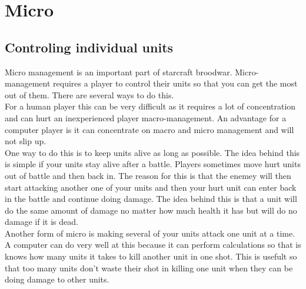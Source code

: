 \section{Micro}
\subsection{Controling individual units}
	Micro management is an important part of starcraft broodwar. Micro-management requires a player to control their units so that you can get the most out of them. There are several ways to do this.\\
	 For a human player this can be very difficult as it requires a lot of concentration and can hurt an inexperienced player macro-management. An advantage for a computer player is it can concentrate on macro and micro management and will not slip up.\\
One way to do this is to keep units alive as long as possible. The idea behind this is simple if your units stay alive after a battle. Players sometimes move hurt units out of battle and then back in. The reason for this is that the enemey will then start attacking another one of your units and then your hurt unit can enter back in the battle and continue doing damage. The idea behind this is that a unit will do the same amount of damage no matter how much health it has but will do no damage if it is dead.\\
	Another form of micro is making several of your units attack one unit at a time. A computer can do very well at this because it can perform calculations so that is knows how many units it takes to kill another unit in one shot. This is usefult so that too many units don't waste their shot in killing one unit when they can be doing damage to other units.\\

